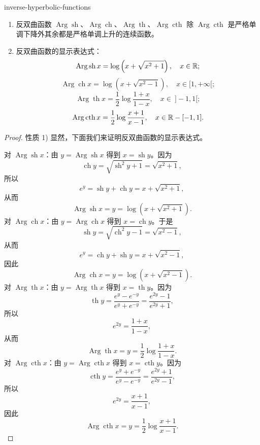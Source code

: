 \begin{mythm}{}{inverse-hyperbolic-functions}

	\begin{enumerate}[label=\arabic*)]
		\item 反双曲函数 \(\operatorname{Arg}\operatorname{sh}\)、\(\operatorname{Arg}\operatorname{ch}\)、\(\operatorname{Arg}\operatorname{th}\)、\(\operatorname{Arg}\operatorname{cth}\) 除 \(\operatorname{Arg}\operatorname{cth}\) 是严格单调下降外其余都是严格单调上升的连续函数。

		\item 反双曲函数的显示表达式：
		\[
		\operatorname{Arg}\operatorname{sh}x=\log\left(x+\sqrt{x^2+1}\right),\quad x\in\mathbb{R};
		\]
		\[
		\operatorname{Arg}\operatorname{ch}x=\log\left(x+\sqrt{x^2-1}\right),\quad x\in[1,+\infty[;
		\]
		\[
		\operatorname{Arg}\operatorname{th}x=\frac12\log\frac{1+x}{1-x},\quad x\in\ ]-1,1[;
		\]
		\[
		\operatorname{Arg}\operatorname{cth}x=\frac12\log\frac{x+1}{x-1},\quad x\in\mathbb{R}-[-1,1].
		\]
	\end{enumerate}

\end{mythm}

\begin{proof}

	性质 1) 显然，下面我们来证明反双曲函数的显示表达式。

	对 \(\operatorname{Arg}\operatorname{sh}x\)：由 \(y=\operatorname{Arg}\operatorname{sh}x\) 得到 \(x=\operatorname{sh}y\)。因为
	\[
	\operatorname{ch}y=\sqrt{\operatorname{sh}^2y+1}=\sqrt{x^2+1},
	\]
	所以
	\[
	e^y=\operatorname{sh}y+\operatorname{ch}y=x+\sqrt{x^2+1},
	\]
	从而
	\[
	\operatorname{Arg}\operatorname{sh}x=y=\log\left(x+\sqrt{x^2+1}\right).
	\]
	对 \(\operatorname{Arg}\operatorname{ch}x\)：由 \(y=\operatorname{Arg}\operatorname{ch}x\) 得到 \(x=\operatorname{ch}y\)。于是
	\[
	\operatorname{sh}y=\sqrt{\operatorname{ch}^2y-1}=\sqrt{x^2-1},
	\]
	从而
	\[
	e^y=\operatorname{ch}y+\operatorname{sh}y=x+\sqrt{x^2-1},
	\]
	因此
	\[
	\operatorname{Arg}\operatorname{ch}x=y=\log\left(x+\sqrt{x^2-1}\right).
	\]
	对 \(\operatorname{Arg}\operatorname{th}x\)：由 \(y=\operatorname{Arg}\operatorname{th}x\) 得到 \(x=\operatorname{th}y\)。因为
	\[
	\operatorname{th}y=\frac{e^y-e^{-y}}{e^y+e^{-y}}=\frac{e^{2y}-1}{e^{2y}+1},
	\]
	所以
	\[
	e^{2y}=\frac{1+x}{1-x},
	\]
	从而
	\[
	\operatorname{Arg}\operatorname{th}x=y=\frac12\log\frac{1+x}{1-x}.
	\]
	对 \(\operatorname{Arg}\operatorname{cth}x\)：由 \(y=\operatorname{Arg}\operatorname{cth}x\) 得到 \(x=\operatorname{cth}y\)。因为
	\[
	\operatorname{cth}y=\frac{e^y+e^{-y}}{e^y-e^{-y}}=\frac{e^{2y}+1}{e^{2y}-1},
	\]
	所以
	\[
	e^{2y}=\frac{x+1}{x-1},
	\]
	因此
	\[
	\operatorname{Arg}\operatorname{cth}x=y=\frac12\log\frac{x+1}{x-1}.
	\]

\end{proof}


